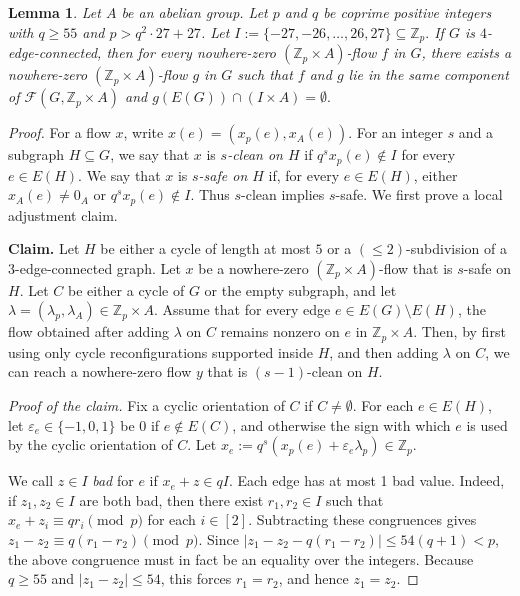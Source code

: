 \documentclass[a4paper,12pt]{article}
\theoremstyle{plain}
\newtheorem{lem}[theorem]{Lemma}
\theoremstyle{definition}
\newcommand{\Z}{\mathbb{Z}}
\newcommand\F{\mathcal{F}}
\renewcommand\le\leqslant
\renewcommand\ge\geqslant
\begin{document}
\begin{lem}
    \label{away-from-boundary-lem}
    Let $A$ be an abelian group.  Let $p$ and $q$ be coprime positive integers with
        $q\ge 55$
        {and}
        $p>q^2\cdot 27+27$.
    Let
        $I:=\{-27,-26,\ldots,26,27\}\subseteq\Z_p.$
    If $G$ is $4$-edge-connected, then for every nowhere-zero $(\Z_p\times A)$-flow $f$ in $G$, there exists a nowhere-zero $(\Z_p\times A)$-flow $g$ in $G$ such that $f$ and $g$ lie in the same component of $\F(G,\Z_p\times A)$ and
       $ g(E(G))\cap (I\times A)=\emptyset.$
\end{lem}
\begin{proof}
For a flow $x$, write $x(e)=(x_p(e),x_A(e))$. For an integer $s$ and a subgraph $H\subseteq G$, we say that $x$ is \emph{$s$-clean on $H$} if $q^s x_p(e)\notin I$ for every $e\in E(H)$. We say that $x$ is \emph{$s$-safe on $H$} if, for every $e\in E(H)$, either $x_A(e)\neq 0_A$ or $q^s x_p(e)\notin I$. Thus $s$-clean implies $s$-safe.
We first prove a local adjustment claim.

\medskip
\noindent\textbf{Claim.}
Let $H$ be either a cycle of length at most $5$ or a $(\le 2)$-subdivision of a $3$-edge-connected graph. Let $x$ be a nowhere-zero $(\mathbb{Z}_p\times A)$-flow that is $s$-safe on $H$. Let $C$ be either a cycle of $G$ or the empty subgraph, and let $\lambda=(\lambda_p,\lambda_A)\in\mathbb{Z}_p\times A$. Assume that for every edge $e\in E(G)\setminus E(H)$, the flow obtained after adding $\lambda$ on $C$ remains nonzero on $e$ in $\mathbb{Z}_p\times A$. Then, by first using only cycle reconfigurations supported inside $H$, and then adding $\lambda$ on $C$, we can reach a nowhere-zero flow $y$ that is $(s-1)$-clean on $H$.

\medskip
\noindent\emph{Proof of the claim.}
Fix a cyclic orientation of $C$ if $C\neq\emptyset$. For each $e\in E(H)$, let $\varepsilon_e\in\{-1,0,1\}$ be $0$ if $e\notin E(C)$, and otherwise the sign with which $e$ is used by the cyclic orientation of $C$. Let $x_e:=q^s(x_p(e)+\varepsilon_e\lambda_p)\in\mathbb{Z}_p$.

We call $z\in I$ \emph{bad} for $e$ if $x_e+z\in qI$. Each edge has at most 1 bad value. Indeed, if $z_1,z_2\in I$ are both bad, then there exist $r_1,r_2\in I$ such that $x_e+z_i\equiv q r_i\pmod p$ for each $i\in[2]$. Subtracting these congruences gives $z_1-z_2\equiv q(r_1-r_2)\pmod p$.
%
Since $|z_1-z_2-q(r_1-r_2)|\le 54(q+1)<p$, the above congruence must in fact be an equality over the integers. Because $q\ge 55$ and $|z_1-z_2|\le 54$, this forces $r_1=r_2$, and hence $z_1=z_2$.


\end{proof}
\end{document}
